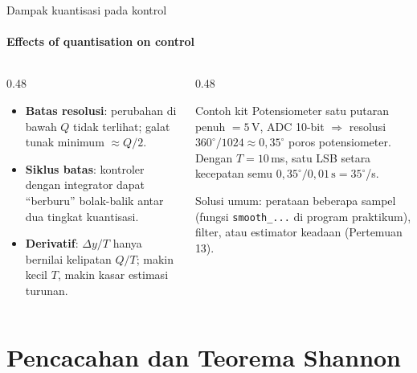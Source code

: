 \documentclass[aspectratio=169,10pt]{beamer}
\begin{document}
\begin{frame}{Dampak kuantisasi pada kontrol}
	\framesubtitle{Effects of quantisation on control}
	\begin{columns}[T]
		\begin{column}{0.48\textwidth}
			\begin{itemize}
				\item \textbf{Batas resolusi}: perubahan di bawah $Q$ tidak terlihat; galat tunak minimum $\approx Q/2$.
				\item \textbf{Siklus batas}: kontroler dengan integrator dapat ``berburu'' bolak-balik antar dua tingkat kuantisasi.
				\item \textbf{Derivatif}: $\Delta y/T$ hanya bernilai kelipatan $Q/T$; makin kecil $T$, makin kasar estimasi turunan.
			\end{itemize}
		\end{column}
		\begin{column}{0.48\textwidth}
			\begin{exampleblock}{Contoh kit}
				\small
				Potensiometer satu putaran penuh $=5$\,V, ADC 10-bit $\Rightarrow$ resolusi $360^\circ/1024 \approx 0{,}35^\circ$ poros potensiometer.\\[3pt]
				Dengan $T=10$\,ms, satu LSB setara kecepatan semu $0{,}35^\circ/0{,}01\,\text{s} = 35^\circ$/s.
			\end{exampleblock}
			{\small Solusi umum: perataan beberapa sampel (fungsi \texttt{smooth\_...} di program praktikum), filter, atau estimator keadaan (Pertemuan 13).}
		\end{column}
	\end{columns}
\end{frame}

\section{Pencacahan dan Teorema Shannon\texorpdfstring{\\[4pt]{\Large{}}}{ / Sampling and Shannon's Theorem}}
\end{document}
